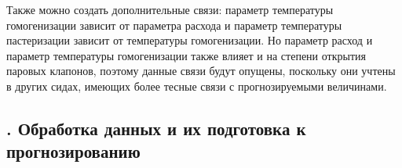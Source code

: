 {  \par \redline Также можно создать дополнительные связи: параметр температуры гомогенизации зависит от параметра расхода и параметр температуры пастеризации зависит от температуры гомогенизации. Но параметр расход и параметр температуры гомогенизации также влияет и на степени открытия паровых клапонов, поэтому данные связи будут опущены, поскольку они учтены в других сидах, имеющих более тесные связи с прогнозируемыми величинами.    

  \par 
}

\titlespace

\subsection*{ 
  \gostTitleFont
  \redline
  \thechaptercntr .\thesubchaptercntr \spc
  Обработка данных и их подготовка к прогнозированию
} \addtocounter{subchaptercntr}{1}

\titlespace

